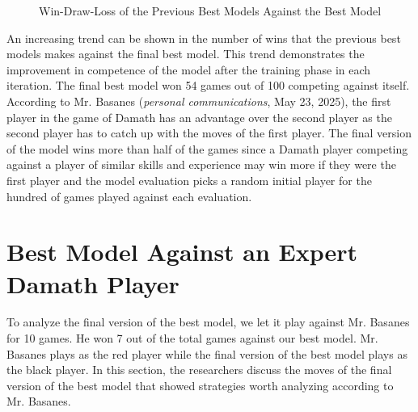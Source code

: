 \wdlevaldata
    
\begin{figure}[H]
    \centering
    \caption{Win-Draw-Loss of the Previous Best Models Against the Best Model}
    \label{fig:wdl-eval}
\end{figure}

An increasing trend can be shown in the number of wins that the previous best models makes against the final best model. This trend demonstrates the improvement in competence of the model after the training phase in each iteration. The final best model won 54 games out of 100 competing against itself. According to Mr. Basanes (\textit{personal communications}, May 23, 2025), the first player in the game of Damath has an advantage over the second player as the second player has to catch up with the moves of the first player. The final version of the model wins more than half of the games since a Damath player competing against a player of similar skills and experience may win more if they were the first player and the model evaluation picks a random initial player for the hundred of games played against each evaluation.

\section{Best Model Against an Expert Damath Player}

To analyze the final version of the best model, we let it play against Mr. Basanes for 10 games. He won 7 out of the total games against our best model. Mr. Basanes plays as the red player while the final version of the best model plays as the black player. In this section, the researchers discuss the moves of the final version of the best model that showed strategies worth analyzing according to Mr. Basanes.

